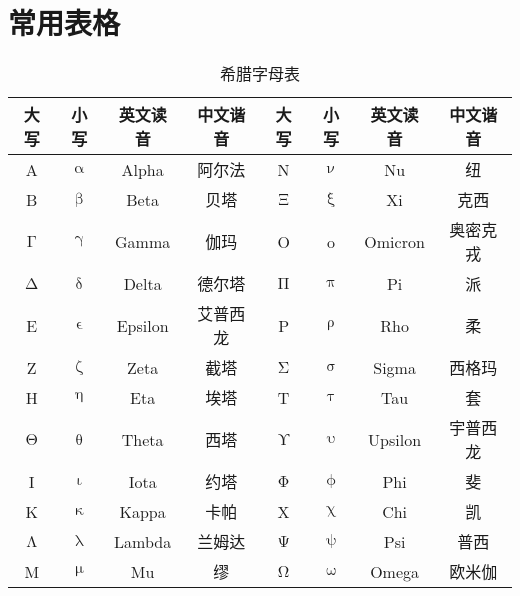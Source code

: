 \documentclass[b5paper,zihao=-4]{ctexbook}
\begin{document}
\appendix

\chapter{常用表格}

\begin{table}[h!]
	\centering
	\begin{tabularx}{\textwidth}{|c|c|C|C||c|c|C|C|}
		\hline
		\textbf{大写} & \textbf{小写} & \textbf{英文读音} & \textbf{中文谐音} & \textbf{大写} & \textbf{小写} & \textbf{英文读音} & \textbf{中文谐音} \\ \hline
		A & $\upalpha$ & Alpha & 阿尔法 & N & $\upnu$ & Nu & 纽 \\ \hline
		B & $\upbeta$ & Beta & 贝塔 & $\upXi$ & $\upxi$ & Xi & 克西 \\ \hline
		$\upGamma$ & $\upgamma$ & Gamma & 伽玛 & O & o & Omicron & 奥密克戎 \\ \hline
		$\upDelta$ & $\updelta$ & Delta & 德尔塔 & $\upPi$ & $\uppi$ & Pi & 派 \\ \hline
		E & $\upvarepsilon$ & Epsilon & 艾普西龙 & P & $\uprho$ & Rho & 柔 \\ \hline
		Z & $\upzeta$ & Zeta & 截塔 & $\upSigma$ & $\upsigma$ & Sigma & 西格玛 \\ \hline
		H & $\upeta$ & Eta & 埃塔 & T & $\uptau$ & Tau & 套 \\ \hline
		$\upTheta$ & $\uptheta$ & Theta & 西塔 & $\upUpsilon$ & $\upupsilon$ & Upsilon & 宇普西龙 \\ \hline
		I & $\upiota$ & Iota & 约塔 & $\upPhi$ & $\upphi$ & Phi & 斐 \\ \hline
		K & $\upkappa$ & Kappa & 卡帕 & X & $\upchi$ & Chi & 凯 \\ \hline
		$\upLambda$ & $\uplambda$ & Lambda & 兰姆达 & $\upPsi$ & $\uppsi$ & Psi & 普西 \\ \hline
		M & $\upmu$ & Mu & 缪 & $\upOmega$ & $\upomega$ & Omega & 欧米伽 \\ \hline
	\end{tabularx}
	\caption{希腊字母表}
	\label{tab:greeks}
\end{table}
\end{document}
